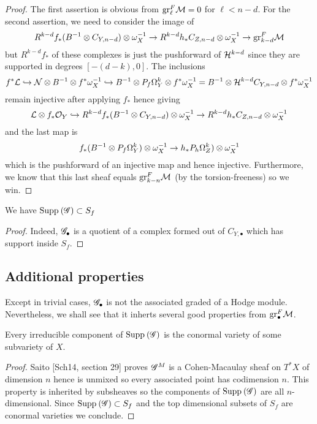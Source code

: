 \documentclass[12pt]{article}
\renewcommand{\gr}{\mathrm{gr}}
\begin{document}
\begin{proof}
The first assertion is obvious from $\gr_{\ell}^F \cM = 0$ for $\ell < n - d$. For the second assertion, we need to consider the image of 
\[ R^{k-d} f_* (B^{-1} \ot C_{Y, n-d}) \ot \omega_X^{-1} \to R^{k-d} h_* C_{Z, n-d} \ot \omega_X^{-1} \to \gr^F_{k-d} \cM \]
but $R^{k-d} f_*$ of these complexes is just the pushforward of $\mathcal{H}^{k-d}$ since they are supported in degrees $[-(d-k), 0]$. The inclusions
\[ f^* \mathcal{L} \hookrightarrow \mathcal{N} \otimes B^{-1} \otimes f^* \omega_X^{-1} \hookrightarrow B^{-1} \otimes P_f \Omega^k_Y \otimes f^* \omega_X^{-1} = B^{-1} \otimes \mathcal{H}^{k-d} C_{Y, n-d} \otimes f^* \omega_X^{-1} \]
remain injective after applying $f_*$ hence giving
\[ \mathcal{L} \otimes f_* \mathcal{O}_{Y} \hookrightarrow R^{k-d} f_* (B^{-1} \otimes C_{Y, n-d}) \otimes \omega_X^{-1} \to R^{k-d} h_* C_{Z, n-d} \otimes \omega_X^{-1} \]
and the last map is
\[ f_* (B^{-1} \otimes P_f \Omega_Y^k) \otimes \omega_X^{-1} \to h_* P_h \Omega_Z^k) \otimes \omega_X^{-1} \]
which is the pushforward of an injective map and hence injective. Furthermore, we know that this last sheaf equals $\gr^F_{k-n} \cM$ (by the torsion-freeness) so we win.
\end{proof}

\begin{prop}
We have $\mathrm{Supp}_{}\left(\mathscr{G} \right) \subset S_f$
\end{prop}

\begin{proof}
Indeed, $\mathscr{G}_\bullet$ is a quotient of a complex formed out of $C_{Y, \bullet}$ which has support inside $S_f$.
\end{proof}

\subsection{Additional properties}


Except in trivial cases, $\mathscr{G}_\bullet$ is not the associated graded of a Hodge module. Nevertheless, we shall see that it inherts several good properties from $\gr_\bullet^F \cM$.

\begin{lemma}
Every irreducible component of $\mathrm{Supp}_{}\left(\mathscr{G} \right)$ is the conormal variety of some subvariety of $X$.
\end{lemma}

\begin{proof}
Saito [Sch14, section 29] proves $\mathscr{G}^M$ is a Cohen-Macaulay sheaf on $T^* X$ of dimension $n$ hence is unmixed so every associated point has codimension $n$. This property is inherited by subsheaves so the components of $\mathrm{Supp}_{}\left(\mathscr{G} \right)$ are all $n$-dimensional. Since $\mathrm{Supp}_{}\left(\mathscr{G} \right) \subset S_f$ and the top dimensional subsets of $S_f$ are conormal varieties we conclude.
\end{proof}
\end{document}
